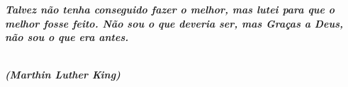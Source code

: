 %
%

\begin{epigrafe}
		
	\textit{\textbf{ Talvez não tenha conseguido fazer o melhor, mas lutei para que o melhor fosse feito. Não sou o que deveria ser, mas Graças a Deus, não sou o que era antes.}}{\\}{\\}
	
	\begin{autorepigrafe}
		\textit{\textbf{(Marthin Luther King)}}
	\end{autorepigrafe}
		
\end{epigrafe}